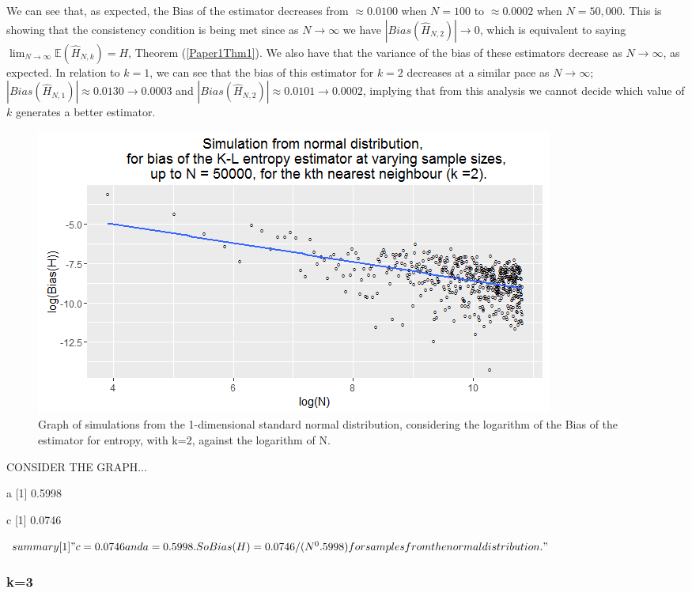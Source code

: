 \documentclass{article}
\begin{document}
We can see that, as expected, the Bias of the estimator decreases from $\approx 0.0100$ when $N=100$ to $\approx 0.0002$ when $N=50,000$. This is showing that the consistency condition is being met since as $N \to \infty$ we have $|Bias(\hat{H}_{N, 2})| \to 0$, which is equivalent to saying $\lim_{N \to \infty} \mathbb{E} (\hat{H}_{N, k}) = H$, Theorem (\ref{Paper1Thm1}). We also have that the variance of the bias of these estimators decrease as $N \to \infty$, as expected. In relation to $k=1$, we can see that the bias of this estimator for $k=2$ decreases at a similar pace as $N \to \infty$; $|Bias(\hat{H}_{N, 1})| \approx 0.0130 \to 0.0003$ and $|Bias(\hat{H}_{N, 2})| \approx 0.0101 \to 0.0002$, implying that from this analysis we cannot decide which value of $k$ generates a better estimator.

\begin{figure}
  \begin{center}
    \includegraphics[width=\textwidth]{./Graphs/Normal_k=2_plot.png}
  \end{center}
  \caption{Graph of simulations from the 1-dimensional standard normal distribution, considering the logarithm of the Bias of the estimator for entropy, with k=2, against the logarithm of N.} 
  \label{normal_k=2_graph}
\end{figure}



CONSIDER THE GRAPH...

a
[1] 0.5998

c
[1] 0.0746

$summary
[1] "c = 0.0746 and a = 0.5998. So Bias(H) = 0.0746/(N^0.5998)  for samples from the normal distribution."$


\subsubsection{k=3} \label{N_k=3}
\end{document}
